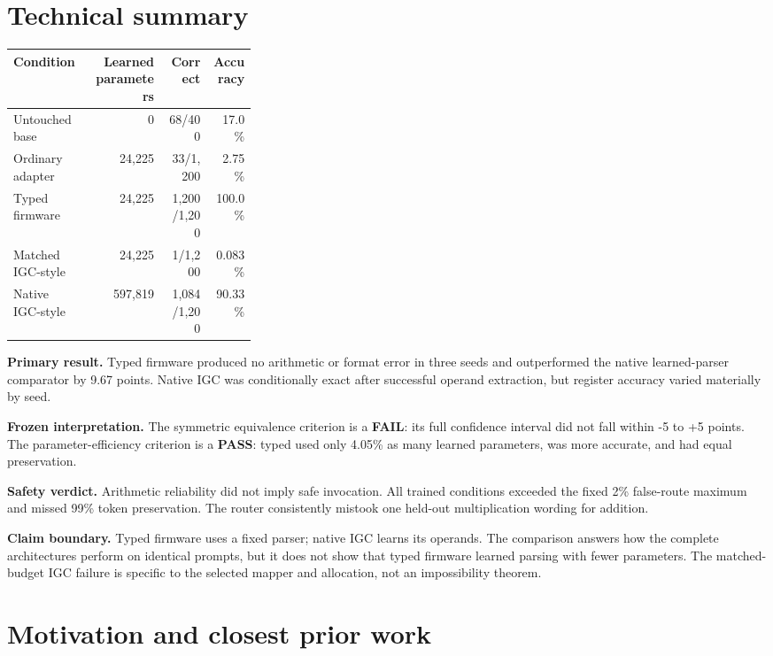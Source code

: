 \documentclass[11pt]{article}
\newcommand{\pass}{\textcolor{passgreen}{\textbf{PASS}}}
\newcommand{\fail}{\textcolor{failred}{\textbf{FAIL}}}
\begin{document}
\section*{Technical summary}

\begin{center}
\small
\begin{tabular}{p{0.32\linewidth}rrr}
\toprule
Condition & Learned parameters & Correct & Accuracy\\
\midrule
Untouched base & 0 & 68/400 & 17.0\%\\
Ordinary adapter & 24,225 & 33/1,200 & 2.75\%\\
Typed firmware & 24,225 & 1,200/1,200 & 100.0\%\\
Matched IGC-style & 24,225 & 1/1,200 & 0.083\%\\
Native IGC-style & 597,819 & 1,084/1,200 & 90.33\%\\
\bottomrule
\end{tabular}
\end{center}

\noindent\textbf{Primary result.}
Typed firmware produced no arithmetic or format error in three seeds and
outperformed the native learned-parser comparator by 9.67 points. Native IGC
was conditionally exact after successful operand extraction, but register
accuracy varied materially by seed.

\medskip
\noindent\textbf{Frozen interpretation.}
The symmetric equivalence criterion is a \fail: its full confidence interval
did not fall within -5 to +5 points. The parameter-efficiency criterion is a
\pass: typed used only 4.05\% as many learned parameters, was more accurate,
and had equal preservation.

\medskip
\noindent\textbf{Safety verdict.}
Arithmetic reliability did not imply safe invocation. All trained conditions
exceeded the fixed 2\% false-route maximum and missed 99\% token preservation.
The router consistently mistook one held-out multiplication wording for
addition.

\medskip
\noindent\textbf{Claim boundary.}
Typed firmware uses a fixed parser; native IGC learns its operands. The
comparison answers how the complete architectures perform on identical
prompts, but it does not show that typed firmware learned parsing with fewer
parameters. The matched-budget IGC failure is specific to the selected mapper
and allocation, not an impossibility theorem.

\section{Motivation and closest prior work}
\end{document}

